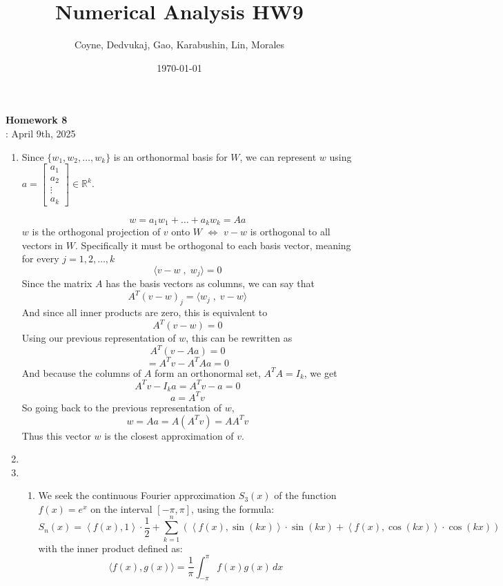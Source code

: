\documentclass[12pt]{article}
\title{Numerical Analysis HW9}
\author{Coyne, Dedvukaj, Gao, Karabushin, Lin, Morales}
\date{\today}
\begin{document}
\pagestyle{fancy}


\begin{center}
\textbf{\Large Homework 8} \\
: April 9th, 2025
\end{center}

\begin{enumerate}[leftmargin=0em]
    \item
    Since $\{w_1,w_2,\dots,w_k\}$ is an orthonormal basis for $W$, we can represent $w$ using
    $a = \begin{bmatrix}
           a_1 \\
           a_2 \\
           \vdots \\
           a_k
         \end{bmatrix}
         \in \mathbb{R}^k$.

    \[
    w = a_1w_1+\dots + a_kw_k = Aa
    \]
    $w$ is the orthogonal projection of $v$ onto $W$ $\iff$ $v-w$ is orthogonal to all vectors in $W$. Specifically it must be orthogonal to each basis vector, meaning for every $j=1,2,\dots,k$ 
    \[ 
    \langle v-w \; , \; w_j \rangle = 0 
    \]
    Since the matrix $A$ has the basis vectors as columns, we can say that 
    \[
    A^T(v-w)_j = \langle w_j \; , \; v-w \rangle
    \]
    And since all inner products are zero, this is equivalent to
    \[
    A^T(v-w)=0
    \]
    Using our previous representation of $w$, this can be rewritten as
    \[
    A^T(v-Aa) = 0
    \]
    \[
    = A^Tv-A^TAa = 0
    \]
    And because the columns of $A$ form an orthonormal set, $A^TA=I_k$, we get
    \[
    A^Tv-I_ka =A^Tv-a = 0
    \]
    \[
    a = A^Tv
    \]
    So going back to the previous representation of $w$,
    \[
    w = Aa = A(A^Tv) = AA^Tv
    \]
    Thus this vector $w$ is the closest approximation of $v$.

    \item 

    \item
    \begin{enumerate}[leftmargin=!]
        \item
        We seek the continuous Fourier approximation \( S_3(x) \) of the function \( f(x) = e^x \) on the interval \( [-\pi, \pi] \), using the formula:
        \[S_n(x) = \left\langle f(x), 1 \right\rangle \cdot \frac{1}{2} + \sum_{k=1}^{n} \left( \left\langle f(x), \sin(kx) \right\rangle \cdot \sin(kx) + \left\langle f(x), \cos(kx) \right\rangle \cdot \cos(kx) \right)\]
        with the inner product defined as:
        \[\langle f(x), g(x) \rangle = \frac{1}{\pi} \int_{-\pi}^{\pi} f(x) g(x) \, dx\]


\end{enumerate}
\end{enumerate}
\end{document}
